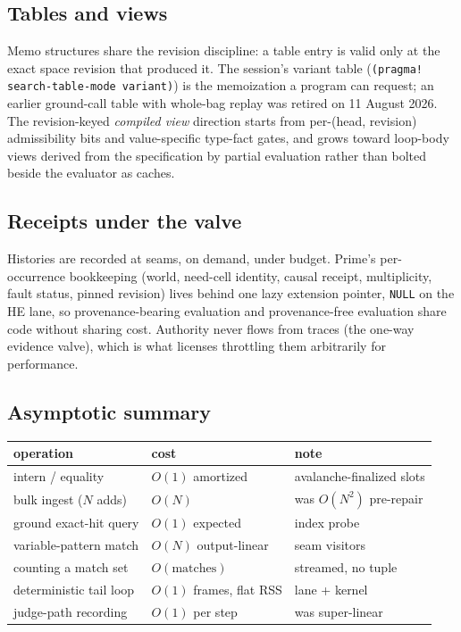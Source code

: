 \documentclass[11pt]{article}
\newcommand{\code}[1]{\texttt{#1}}
\newcommand{\HE}{\textup{HE}}
\begin{document}
\subsection{Tables and views}

Memo structures share the revision discipline: a table entry is valid
only at the exact space revision that produced it.  The session's variant
table (\code{(pragma! search-table-mode variant)}) is the memoization a
program can request; an earlier ground-call table with whole-bag replay was
retired on 11 August 2026.  The revision-keyed \emph{compiled view}
direction starts from per-(head, revision) admissibility bits and
value-specific type-fact gates, and grows toward loop-body views derived
from the specification by partial evaluation rather than bolted beside the
evaluator as caches.

\subsection{Receipts under the valve}

Histories are recorded at seams, on demand, under budget.  Prime's
per-occurrence bookkeeping (world, need-cell identity, causal receipt,
multiplicity, fault status, pinned revision) lives behind one lazy
extension pointer, \code{NULL} on the \HE{} lane, so provenance-bearing
evaluation and provenance-free evaluation share code without sharing
cost.  Authority never flows from traces (the one-way evidence valve),
which is what licenses throttling them arbitrarily for performance.

\subsection{Asymptotic summary}

\begin{center}
\begin{tabular}{lll}
\hline
operation & cost & note \\
\hline
intern / equality & $O(1)$ amortized & avalanche-finalized slots \\
bulk ingest ($N$ adds) & $O(N)$ & was $O(N^2)$ pre-repair \\
ground exact-hit query & $O(1)$ expected & index probe \\
variable-pattern match & $O(N)$ output-linear & seam visitors \\
counting a match set & $O(\text{matches})$ & streamed, no tuple \\
deterministic tail loop & $O(1)$ frames, flat RSS & lane + kernel \\
judge-path recording & $O(1)$ per step & was super-linear \\
\hline
\end{tabular}
\end{center}
\end{document}
